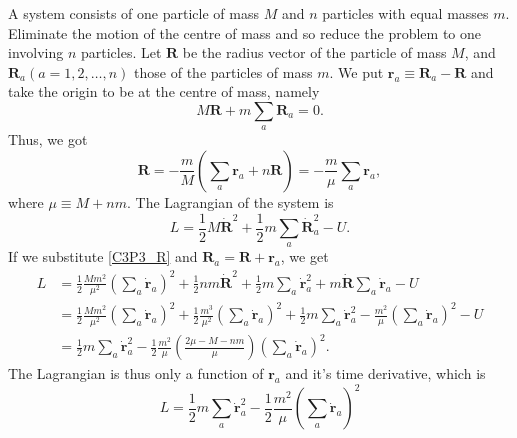 
\begin{problem}
{
A system consists of one particle of mass $M$ and $n$ particles with equal masses $m$. Eliminate the motion of the centre of mass and so reduce the problem to one involving $n$ particles.
}
{
Let $\mathbf{R}$ be the radius vector of the particle of mass $M$, and $\mathbf{R}_a \left( a=1, 2, \ldots, n \right)$ those of the particles of mass $m$. We put $\mathbf{r}_a \equiv \mathbf{R}_a - \mathbf{R}$ and take the origin to be at the centre of mass, namely
\begin{equation*}
    M\mathbf{R} + m\sum_a \mathbf{R}_a = 0.
\end{equation*}
Thus, we got
\begin{equation} \label{C3P3_R}
    \mathbf{R} = -\frac{m}{M}\left(\sum_a\mathbf{r}_a + n\mathbf{R}\right) = -\frac{m}{\mu} \sum_a \mathbf{r}_a,
\end{equation}
where $\mu \equiv M + nm$. The Lagrangian of the system is
\begin{equation*}
    L = \frac{1}{2}M\Dot{\mathbf{R}}^2 + \frac{1}{2}m\sum_a\Dot{\mathbf{R}}_a^2 - U.
\end{equation*}
If we substitute \eqref{C3P3_R} and $\mathbf{R}_a = \mathbf{R} + \mathbf{r}_a$, we get
\begin{align*}
    L &= \frac{1}{2}\frac{Mm^2}{\mu^2} \left( \sum_a \Dot{\mathbf{r}}_a \right)^2 + \frac{1}{2}nm\Dot{\mathbf{R}}^2 + \frac{1}{2}m\sum_a\Dot{\mathbf{r}}_a^2 + m\Dot{\mathbf{R}}\sum_a \Dot{\mathbf{r}}_a - U \\
    &= \frac{1}{2}\frac{Mm^2}{\mu^2} \left( \sum_a \Dot{\mathbf{r}}_a \right)^2 + \frac{1}{2}\frac{m^3}{\mu^2}\left( \sum_a \Dot{\mathbf{r}}_a \right)^2 + \frac{1}{2}m\sum_a\Dot{\mathbf{r}}_a^2 - \frac{m^2}{\mu}\left(\sum_a \Dot{\mathbf{r}}_a\right)^2 - U \\
    &= \frac{1}{2}m\sum_a\Dot{\mathbf{r}}_a^2 - \frac{1}{2}\frac{m^2}{\mu}\left( \frac{2\mu-M-nm}{\mu} \right)\left(\sum_a \Dot{\mathbf{r}}_a\right)^2.
\end{align*}
The Lagrangian is thus only a function of $\mathbf{r}_a$ and it's time derivative, which is
}
{
\begin{equation*}
    L = \frac{1}{2}m\sum_a\Dot{\mathbf{r}}_a^2 - \frac{1}{2}\frac{m^2}{\mu}\left(\sum_a \Dot{\mathbf{r}}_a\right)^2
\end{equation*}
}
\end{problem}


